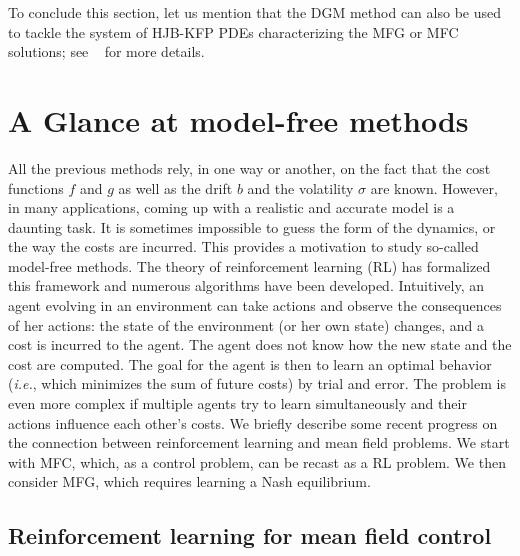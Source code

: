 \documentclass{amsproc}
\theoremstyle{definition}
\theoremstyle{remark}
\numberwithin{equation}{section}
\begin{document}
To conclude this section, let us mention that the DGM method can also be used to tackle the system of HJB-KFP PDEs characterizing the MFG or MFC solutions; see ~\cite{al2018solving,carmona2019convergence1} for more details.



\clearpage

\section{\bf A Glance at model-free methods}
\label{AMS-num-sec:modelfree}


All the previous methods rely, in one way or another, on the fact that the cost functions $f$ and $g$ as well as the drift $b$ and the volatility $\sigma$ are known. However, in many applications, coming up with a realistic and accurate model is a daunting task. It is sometimes impossible to guess the form of the dynamics, or the way the costs are incurred. This provides a motivation to study so-called model-free methods. The theory of reinforcement learning (RL) has formalized this framework and numerous algorithms have been developed. Intuitively, an agent evolving in an environment can take actions and observe the consequences of her actions: the state of the environment (or her own state) changes, and a cost is incurred to the agent. The agent does not know how the new state and the cost are computed. The goal for the agent is then to learn an optimal behavior (\textit{i.e.}, which minimizes the sum of future costs) by trial and error. The problem is even more complex if multiple agents try to learn simultaneously and their actions influence each other's costs. We briefly describe some recent progress on the connection between reinforcement learning and mean field problems. We start with MFC, which, as a control problem, can be recast as a RL problem. We then consider MFG, which requires learning a Nash equilibrium.


\subsection{Reinforcement learning for mean field control}
\end{document}
